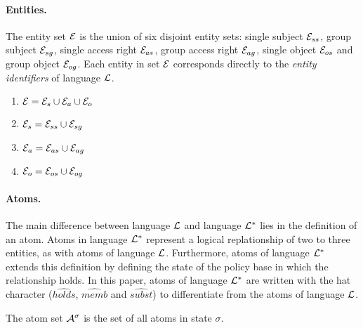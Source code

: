 \documentclass[10pt, twocolumn]{article}
\begin{document}
        \paragraph{Entities.}

          The entity set ${\cal E}$ is the union of six disjoint entity sets:
          single subject ${\cal E}_{ss}$, group subject ${\cal E}_{sg}$,
          single access right ${\cal E}_{as}$, group access right
          ${\cal E}_{ag}$, single object ${\cal E}_{os}$ and group object
          ${\cal E}_{og}$. Each entity in set ${\cal E}$ corresponds directly
          to the \emph{entity identifiers} of language ${\cal L}$.

          \begin{enumerate}
            \item
              ${\cal E} = {\cal E}_{s} \cup {\cal E}_{a} \cup {\cal E}_{o}$
            \item
              ${\cal E}_{s} = {\cal E}_{ss} \cup {\cal E}_{sg}$
            \item
              ${\cal E}_{a} = {\cal E}_{as} \cup {\cal E}_{ag}$
            \item
              ${\cal E}_{o} = {\cal E}_{os} \cup {\cal E}_{og}$
          \end{enumerate}

        \paragraph{Atoms.}

          The main difference between language ${\cal L}$ and language
          ${\cal L}^{*}$ lies in the definition of an atom. Atoms in language
          ${\cal L}^{*}$ represent a logical replationship of two to three
          entities, as with atoms of language ${\cal L}$. Furthermore, atoms of
          language ${\cal L}^{*}$ extends this definition by defining the
          state of the policy base in which the relationship holds. In this
          paper, atoms of language ${\cal L}^{*}$ are written with the
          hat character ($\hat{holds}$, $\hat{memb}$ and $\hat{subst}$) to
          differentiate from the atoms of language ${\cal L}$.

          The atom set ${\cal A}^{\sigma}$ is the set of all atoms in state
          $\sigma$. 
\end{document}

